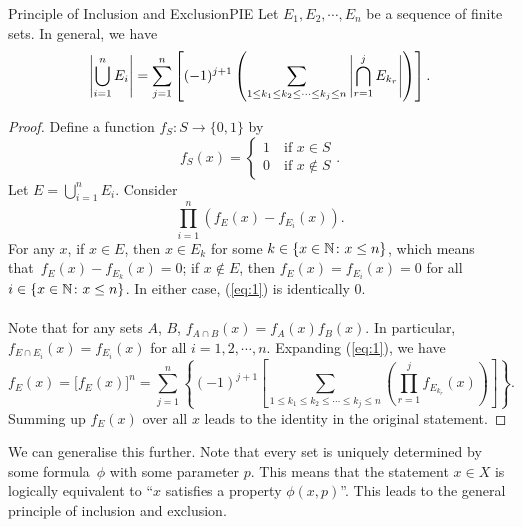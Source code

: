 \documentclass[math]{amznotes}
\theoremstyle{remark}
\newcommand{\0}{\mathbf{0}}
\newcommand{\1}{\mathbf{1}}
\begin{document}
\begin{thmbox}{Principle of Inclusion and Exclusion}{PIE}
    Let $E_1, E_2, \cdots, E_n$ be a sequence of finite sets. In general, we have
    \begin{equation*}
        {\left\lvert {\bigcup_{i = 1}^n E_i} \right\rvert} = \sum_{j = 1}^{n} \left[(-1)^{j + 1}\left(\sum_{1 \leq k_1 \leq k_2 \leq \cdots \leq k_j \leq n}{\left\lvert {\bigcap_{r = 1}^{j}E_{k_r}} \right\rvert}\right)\right].
    \end{equation*}
    \tcblower
    \begin{proof}
        Define a function $f_S \colon S \to \{0, 1\}$ by
        \begin{equation*}
            f_S(x) = \begin{cases}
                1 \quad \textrm{if } x \in S \\
                0 \quad \textrm{if } x \notin S
            \end{cases}.
        \end{equation*}
        Let $E = \bigcup_{i = 1}^n E_i$. Consider
        \begin{equation}\label{eq:1}
            \prod_{i = 1}^{n}\left(f_E(x) - f_{E_i}(x)\right). \tag{*}
        \end{equation}
        For any $x$, if $x \in E$, then $x \in E_k$ for some $k \in \left\{x \in \mathbb{N} \colon x \leq n\right\}$, which means that~$f_E(x) - f_{E_k}(x) = 0$; if $x \notin E$, then $f_E(x) = f_{E_i}(x) = 0$ for all $i \in \left\{x \in \mathbb{N} \colon x \leq n\right\}$. In either case, (\ref{eq:1}) is identically $0$.
        \\\\
        Note that for any sets $A$, $B$, $f_{A \cap B}(x) = f_A(x)f_B(x)$. In particular, $f_{E \cap E_i}(x) = f_{E_i}(x)$ for all $i = 1, 2, \cdots, n$. Expanding (\ref{eq:1}), we have
        \begin{equation*}
            f_E(x) = \bigl[f_E(x)\bigr]^n = \sum_{j = 1}^{n} \left\{(-1)^{j + 1}\left[\sum_{1 \leq k_1 \leq k_2 \leq \cdots \leq k_j \leq n}\left(\prod_{r = 1}^{j}f_{E_{k_r}}(x)\right)\right]\right\}.
        \end{equation*}
        Summing up $f_E(x)$ over all $x$ leads to the identity in the original statement.
    \end{proof}
\end{thmbox}
We can generalise this further. Note that every set is uniquely determined by some formula~$\phi$ with some parameter $p$. This means that the statement $x \in X$ is logically equivalent to ``$x$ satisfies a property $\phi(x, p)$''. This leads to the general principle of inclusion and exclusion.
\end{document}
